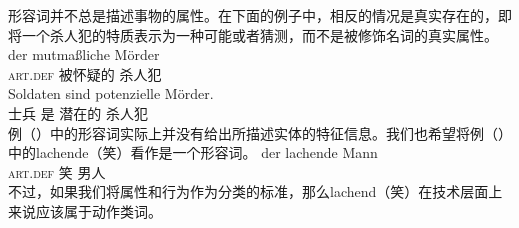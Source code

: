 形容词并不总是描述事物的属性。在下面的例子中，相反的情况是真实存在的，即将一个杀人犯的特质表示为一种可能或者猜测，而不是被修饰名词的真实属性。
\eal
\ex 
\gll der mutmaßliche Mörder\\
     \textsc{art}.\textsc{def} 被怀疑的 杀人犯\\
\ex 
\gll Soldaten sind potenzielle Mörder.\\
     士兵 是 潜在的 杀人犯\\
\zl
例（）中的形容词实际上并没有给出所描述实体的特征信息。我们也希望将例（）中的lachende（笑）看作是一个形容词。
\ea
\gll der lachende Mann\\
	 \textsc{art}.\textsc{def} 笑 男人\\
\z
不过，如果我们将属性和行为作为分类的标准，那么lachend（笑）在技术层面上来说应该属于动作类词。

